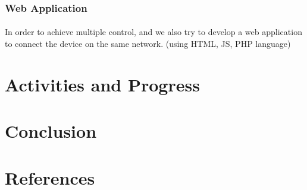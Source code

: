 \documentclass[a4paper,12pt]{article}
\begin{document}
\subsubsection{Web Application}
\paragraph{}
In order to achieve multiple control, and we also try to develop a web application to connect the device on the same network. (using HTML, JS, PHP language)

\section{Activities and Progress}

\section{Conclusion}

\section*{References}
\end{document}
